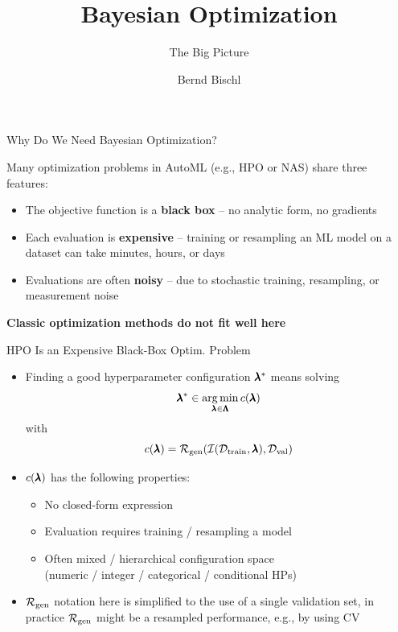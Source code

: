 \documentclass[main]{subfiles}
\begin{document}
\title[AutoML: BO]{Bayesian Optimization}
\subtitle{The Big Picture}
\author[Bernd Bischl]{Bernd Bischl}
\date{}



    \maketitle


\begin{frame}[c]{Why Do We Need Bayesian Optimization?}

Many optimization problems in AutoML (e.g., HPO or NAS) share three features:
\begin{itemize}
    \item The objective function is a \textbf{black box} -- no analytic form, no gradients
    \item Each evaluation is \textbf{expensive} -- training or resampling an ML model on a dataset can take minutes, hours, or days
    \item Evaluations are often \textbf{noisy} -- due to stochastic training, resampling, or measurement noise
\end{itemize}
\vspace{0.3cm}
\begin{center}
\textbf{Classic optimization methods do not fit well here}
\end{center}
\end{frame}


\begin{frame}{HPO Is an Expensive Black-Box Optim. Problem}
\begin{itemize}
    \item Finding a good hyperparameter configuration $\pmb{\lambda}^\ast$ means solving
    $$\pmb{\lambda}^\ast \in \operatorname*{arg\,min}_{\pmb{\lambda} \in \pmb{\Lambda}} c(\pmb{\lambda})$$
    with
    $$c(\pmb{\lambda}) = \mathcal{R}_{\text{gen}}(\mathcal{I}(\mathcal{D}_{\text{train}}, \pmb{\lambda}) , \mathcal{D}_{\text{val}})$$
    
    \item $c(\pmb{\lambda})$ has the following properties:
    \begin{itemize}
        \item No closed-form expression
        \item Evaluation requires training / resampling a model
        \item Often mixed / hierarchical configuration space\\
        (numeric / integer / categorical / conditional HPs)
    \end{itemize}
    \item $\mathcal{R}_{\text{gen}}$ notation here is simplified to the use of a single validation set,
    in practice $\mathcal{R}_{\text{gen}}$ might be a resampled performance, e.g., by using CV
\end{itemize}
\end{frame}
\end{document}
